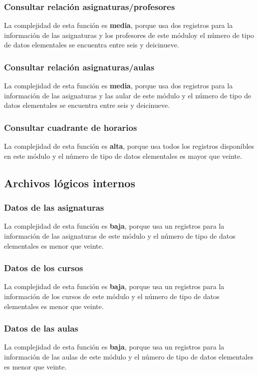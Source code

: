 \documentclass[11pt,a4paper,spanish,twoside]{book}
\begin{document}
\subsubsection{Consultar relación asignaturas/profesores}
La complejidad de esta función es \textbf{media}, porque usa dos
registros para la información de las asignaturas y los profesores de este
móduloy el número de tipo de datos elementales se encuentra entre seis y
deicinueve.
\subsubsection{Consultar relación asignaturas/aulas}
La complejidad de esta función es \textbf{media}, porque usa dos
registros para la información de las asignaturas y las aular de este
módulo y el número de tipo de datos elementales se encuentra entre seis y
deicinueve.
\subsubsection{Consultar cuadrante de horarios}
La complejidad de esta función es \textbf{alta}, porque usa todos los
registros disponibles en este módulo y el número de tipo de datos elementales
es mayor que veinte.

\subsection{Archivos lógicos internos}
\subsubsection{Datos de las asignaturas}
La complejidad de esta función es \textbf{baja}, porque usa un
registros para la información de las asignaturas de este módulo y el número
de tipo de datos elementales es menor que veinte.

\subsubsection{Datos de los cursos}
La complejidad de esta función es \textbf{baja}, porque usa un
registros para la información de los cursos de este módulo y el número
de tipo de datos elementales es menor que veinte.

\subsubsection{Datos de las aulas}
La complejidad de esta función es \textbf{baja}, porque usa un
registros para la información de las aulas de este módulo y el número
de tipo de datos elementales es menor que veinte.
\end{document}
